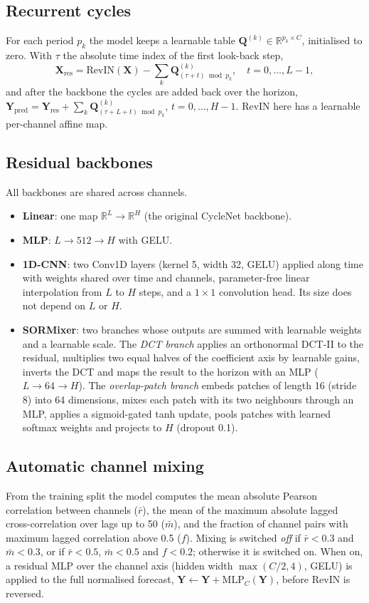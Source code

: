 \documentclass[11pt,a4paper]{article}
\begin{document}
\subsection{Recurrent cycles}
For each period $p_k$ the model keeps a learnable table $\mathbf{Q}^{(k)}\in\mathbb{R}^{p_k\times C}$, initialised to zero. With $\tau$ the absolute time index of the first look-back step,
\begin{equation}
\mathbf{X}_{\text{res}} = \mathrm{RevIN}(\mathbf{X}) - \sum_k \mathbf{Q}^{(k)}_{(\tau+t)\bmod p_k},\quad t=0,\dots,L-1,
\end{equation}
and after the backbone the cycles are added back over the horizon, $\mathbf{Y}_{\text{pred}} = \mathbf{Y}_{\text{res}} + \sum_k \mathbf{Q}^{(k)}_{(\tau+L+t)\bmod p_k}$, $t=0,\dots,H-1$. RevIN here has a learnable per-channel affine map.

\subsection{Residual backbones}
All backbones are shared across channels.
\begin{itemize}
    \item \textbf{Linear}: one map $\mathbb{R}^{L}\to\mathbb{R}^{H}$ (the original CycleNet backbone).
    \item \textbf{MLP}: $L\to512\to H$ with GELU.
    \item \textbf{1D-CNN}: two Conv1D layers (kernel 5, width 32, GELU) applied along time with weights shared over time and channels, parameter-free linear interpolation from $L$ to $H$ steps, and a $1\times1$ convolution head. Its size does not depend on $L$ or $H$.
    \item \textbf{SORMixer}: two branches whose outputs are summed with learnable weights and a learnable scale. The \emph{DCT branch} applies an orthonormal DCT-II to the residual, multiplies two equal halves of the coefficient axis by learnable gains, inverts the DCT and maps the result to the horizon with an MLP ($L\to64\to H$). The \emph{overlap-patch branch} embeds patches of length 16 (stride 8) into 64 dimensions, mixes each patch with its two neighbours through an MLP, applies a sigmoid-gated tanh update, pools patches with learned softmax weights and projects to $H$ (dropout 0.1).
\end{itemize}

\subsection{Automatic channel mixing}
From the training split the model computes the mean absolute Pearson correlation between channels ($\bar r$), the mean of the maximum absolute lagged cross-correlation over lags up to 50 ($\bar m$), and the fraction of channel pairs with maximum lagged correlation above 0.5 ($f$). Mixing is switched \emph{off} if $\bar r<0.3$ and $\bar m<0.3$, or if $\bar r<0.5$, $\bar m<0.5$ and $f<0.2$; otherwise it is switched on. When on, a residual MLP over the channel axis (hidden width $\max(C/2,4)$, GELU) is applied to the full normalised forecast, $\mathbf{Y}\leftarrow\mathbf{Y}+\mathrm{MLP}_C(\mathbf{Y})$, before RevIN is reversed.
\end{document}
